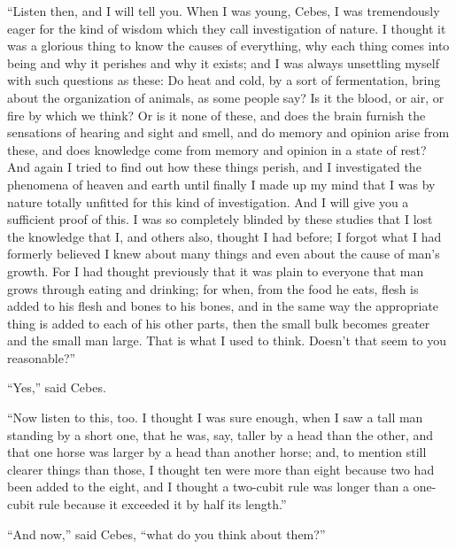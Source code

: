 \documentclass[letterpaper,12pt]{article}
\newcommand{\stephpag}[1]{\marginnote{\small\itshape\fontfamily{ppl}\selectfont #1}}
\begin{document}
\begin{drama}
``Listen then, and I will tell you. When I was young, Cebes, I was tremendously eager for the kind of wisdom which they call investigation of nature. I thought it was a glorious thing to know the causes of everything, why each thing comes into being and why it perishes and why it exists; \stephpag{b} and I was always unsettling myself with such questions as these: Do heat and cold, by a sort of fermentation, bring about the organization of animals, as some people say? Is it the blood, or air, or fire by which we think? Or is it none of these, and does the brain furnish the sensations of hearing and sight and smell, and do memory and opinion arise from these, and does knowledge come from memory and opinion in a state of rest? And again I tried to find out \stephpag{c} how these things perish, and I investigated the phenomena of heaven and earth until finally I made up my mind that I was by nature totally unfitted for this kind of investigation. And I will give you a sufficient proof of this. I was so completely blinded by these studies that I lost the knowledge that I, and others also, thought I had before; I forgot what I had formerly believed I knew about many things and even about the cause of man's growth. For I had thought previously that it was plain to everyone that man grows through eating and \stephpag{d} drinking; for when, from the food he eats, flesh is added to his flesh and bones to his bones, and in the same way the appropriate thing is added to each of his other parts, then the small bulk becomes greater and the small man large. That is what I used to think. Doesn't that seem to you reasonable?''
 
``Yes,'' said Cebes.
 
``Now listen to this, too. I thought I was sure enough, when I saw a tall man standing by a short one, that he was, say, taller by a head than the other, \stephpag{e} and that one horse was larger by a head than another horse; and, to mention still clearer things than those, I thought ten were more than eight because two had been added to the eight, and I thought a two-cubit rule was longer than a one-cubit rule because it exceeded it by half its length.''
 
``And now,'' said Cebes, ``what do you think about them?''
 

\end{drama}
\end{document}
